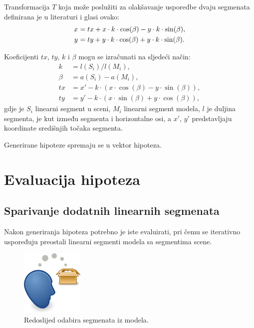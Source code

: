 \documentclass[lmodern, utf8, seminar, numeric]{fer}
\begin{document}
Transformacija $T$ koja može poslužiti za olakšavanje usporedbe dvaju segmenata definirana je u literaturi \citep{ayache2009hyper} i glasi ovako:
\begin{align}
x^{\*} & = tx + x\cdot k\cdot \cos(\beta) - y\cdot k\cdot \sin(\beta), \\
y^{\*} & = ty + y\cdot k\cdot \cos(\beta) + y\cdot k\cdot \sin(\beta).
\end{align}

Koeficijenti $tx$, $ty$, $k$ i $\beta$ mogu se izračunati na sljedeći način:
\begin{align}
k & = l(S_i)/l(M_i),\\
\beta & = a(S_i) - a(M_i),\\
tx & = x' - k\cdot ( x \cdot \cos(\beta) - y\cdot \sin(\beta)), \\
ty & = y' - k\cdot ( x \cdot \sin(\beta) + y\cdot \cos(\beta)),
\end{align}
gdje je $S_i$ linearni segment u sceni, $M_i$ linearni segment modela, $l$ je duljina segmenta, je kut između segmenta i horizontalne osi, a $x'$, $y'$ predstavljaju koordinate središnjih točaka segmenta.

Generirane hipoteze spremaju se u vektor hipoteza.

\section{Evaluacija hipoteza}
\subsection{Sparivanje dodatnih linearnih segmenata}
Nakon generiranja hipoteza potrebno je iste evaluirati, pri čemu se iterativno uspoređuju preostali linearni segmenti modela sa segmentima scene.

\begin{figure}[htb]
\begin{center}
\includegraphics[width=3cm]{resources/img.png}
\end{center}
\caption{Redoslijed odabira segmenata iz modela.}
\label{fig:redoslijed_odabira}
\end{figure}
\end{document}
